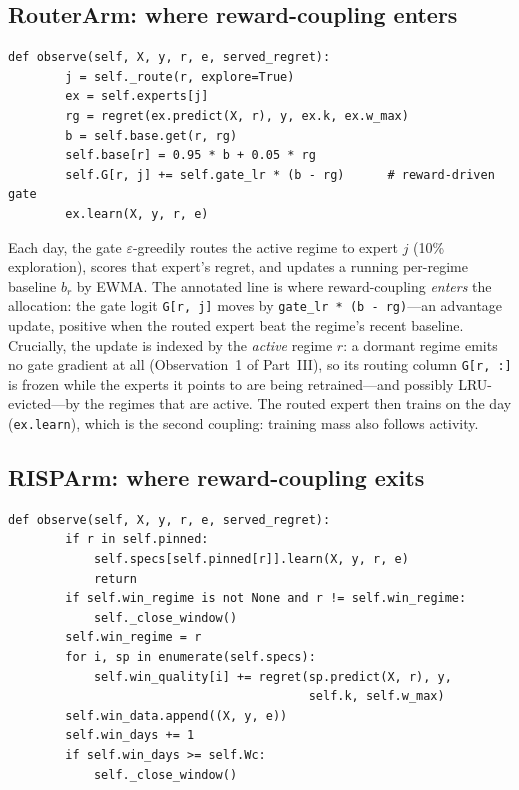 \documentclass[11pt,a4paper]{article}
\theoremstyle{definition}
\theoremstyle{plain}
\begin{document}
\subsection{RouterArm: where reward-coupling enters}
\label{sec:dd6-router}

\begin{lstlisting}[caption={\texttt{RouterArm.observe}: the reward-driven gate (\texttt{risp.py}).},label={lst:dd6-router}]
    def observe(self, X, y, r, e, served_regret):
        j = self._route(r, explore=True)
        ex = self.experts[j]
        rg = regret(ex.predict(X, r), y, ex.k, ex.w_max)
        b = self.base.get(r, rg)
        self.base[r] = 0.95 * b + 0.05 * rg
        self.G[r, j] += self.gate_lr * (b - rg)      # reward-driven gate
        ex.learn(X, y, r, e)
\end{lstlisting}

Each day, the gate $\varepsilon$-greedily routes the active regime to expert
$j$ (10\% exploration), scores that expert's regret, and updates a running
per-regime baseline $b_r$ by EWMA. The annotated line is where
reward-coupling \emph{enters} the allocation: the gate logit
\texttt{G[r, j]} moves by \texttt{gate\_lr * (b - rg)}---an advantage
update, positive when the routed expert beat the regime's recent baseline.
Crucially, the update is indexed by the \emph{active} regime $r$: a dormant
regime emits no gate gradient at all (Observation~1 of Part~III), so its
routing column \texttt{G[r, :]} is frozen while the experts it points to
are being retrained---and possibly LRU-evicted---by the regimes that are
active. The routed expert then trains on the day
(\texttt{ex.learn}), which is the second coupling: training mass also
follows activity.

\subsection{RISPArm: where reward-coupling exits}
\label{sec:dd6-risp}

\begin{lstlisting}[caption={\texttt{RISPArm.observe}: window accumulation and the pinning short-circuit (\texttt{risp.py}).},label={lst:dd6-nmobserve}]
    def observe(self, X, y, r, e, served_regret):
        if r in self.pinned:
            self.specs[self.pinned[r]].learn(X, y, r, e)
            return
        if self.win_regime is not None and r != self.win_regime:
            self._close_window()
        self.win_regime = r
        for i, sp in enumerate(self.specs):
            self.win_quality[i] += regret(sp.predict(X, r), y,
                                          self.k, self.w_max)
        self.win_data.append((X, y, e))
        self.win_days += 1
        if self.win_days >= self.Wc:
            self._close_window()
\end{lstlisting}
\end{document}
